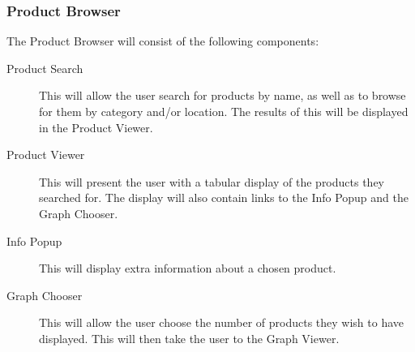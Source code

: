 \subsubsection{Product Browser}

The Product Browser will consist of the following components:
\begin{description}
\item[Product Search] This will allow the user search for products by name, as well as to browse for them by category and/or location. The results of this will be displayed in the Product Viewer.
\item[Product Viewer] This will present the user with a tabular display of the products they searched for. The display will also contain links to the Info Popup and the Graph Chooser.
\item[Info Popup] This will display extra information about a chosen product.
\item[Graph Chooser] This will allow the user choose the number of products they wish to have displayed. This will then take the user to the Graph Viewer.
\end{description} 


